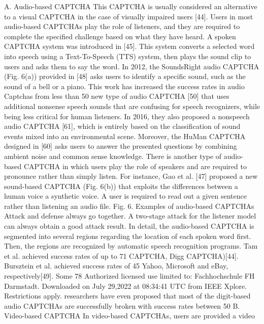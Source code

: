 
A. Audio-based CAPTCHA
This CAPTCHA is usually considered an alternative to a
visual CAPTCHA in the case of visually impaired users [44].
Users in most audio-based CAPTCHAs play the role of
listeners, and they are required to complete the specified
challenge based on what they have heard. A spoken
CAPTCHA system was introduced in [45]. This system
converts a selected word into speech using a Text-To-Speech
(TTS) system, then plays the sound clip to users and asks them
to say the word. In 2012, the SoundsRight audio CAPTCHA
(Fig. 6(a)) provided in [48] asks users to identify a specific
sound, such as the sound of a bell or a piano. This work has
increased the success rates in audio Captchas from less than
50%
new type of audio CAPTCHA [50] that uses additional
nonsense speech sounds that are confusing for speech
recognizers, while being less critical for human listeners. In
2016, they also proposed a nonspeech audio CAPTCHA [61],
which is entirely based on the classification of sound events
mixed into an environmental scene. Moreover, the HuMan
CAPTCHA designed in [60] asks users to answer the
presented questions by combining ambient noise and common
sense knowledge. There is another type of audio-based
CAPTCHA in which users play the role of speakers and are
required to pronounce rather than simply listen. For instance,
Gao et al. [47] proposed a new sound-based CAPTCHA (Fig.
6(b)) that exploits the differences between a human voice a
synthetic voice. A user is required to read out a given sentence
rather than listening an audio file.
Fig. 6. Examples of audio-based CAPTCHAs
Attack and defense always go together. A two-stage attack
for the listener model can always obtain a good attack result.
In detail, the audio-based CAPTCHA is segmented into
several regions regarding the location of each spoken word
first. Then, the regions are recognized by automatic speech
recognition programs. Tam et al. achieved success rates of up
to 71%
CAPTCHA, Digg CAPTCHA)[44]. Bursztein et al. achieved
success rates of 45%
Yahoo, Microsoft and eBay, respectively[49]. Some
78
Authorized licensed use limited to: Fachhochschule FH Darmstadt. Downloaded on July 29,2022 at 08:34:41 UTC from IEEE Xplore. Restrictions apply.
researchers have even proposed that most of the digit-based
audio CAPTCHAs are successfully broken with success rates
between 50%
B. Video-based CAPTCHA
In video-based CAPTCHAs, users are provided a video
